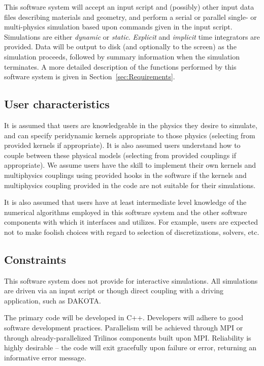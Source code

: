 \documentclass[10pt]{article}
\theoremstyle{plain}
\theoremstyle{definition}
\begin{document}
This software system will accept an input script and (possibly) other input data files describing materials and geometry, and perform a serial or parallel single- or multi-physics simulation based upon commands given in the input script. Simulations are either \emph{dynamic} or \emph{static}. \emph{Explicit} and \emph{implicit} time integrators are provided. Data will be output to disk (and optionally to the screen) as the simulation proceeds, followed by summary information when the simulation terminates.  A more detailed description of the functions performed by this software system is given in Section~\ref{sec:Requirements}.

\subsection{User characteristics}

It is assumed that users are knowledgeable in the physics they desire to simulate, and can specify peridynamic kernels appropriate to those physics (selecting from provided kernels if appropriate). It is also assumed users understand how to couple between these physical models (selecting from provided couplings if appropriate). We assume users have the skill to implement their own kernels and multiphysics couplings using provided hooks in the software if the kernels and multiphysics coupling provided in the code are not suitable for their simulations.

It is also assumed that users have at least intermediate level knowledge of the numerical algorithms employed in this software system and the other software components with which it interfaces and utilizes. For example, users are expected not to make foolish choices with regard to selection of discretizations, solvers, etc.

\subsection{Constraints}

This software system does not provide for interactive simulations. All simulations are driven via an input script or though direct coupling with a driving application, such as DAKOTA.

The primary code will be developed in C++. Developers will adhere to good software development practices. Parallelism will be achieved through MPI or through already-parallelized Trilinos components built upon MPI.  Reliability is highly desirable -- the code will exit gracefully upon failure or error, returning an informative error message.
\end{document}
